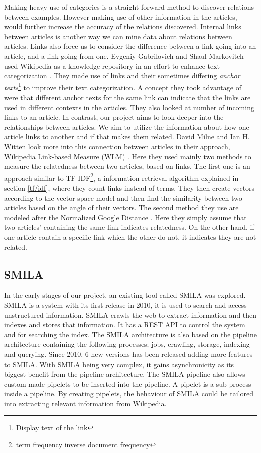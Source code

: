 Making heavy use of categories is a straight forward method to discover relations between examples. However making use of other information in the articles, would further increase the accuracy of the relations discovered. Internal links between articles is another way we can mine data about relations between articles. Links also force us to consider the difference between a link going into an article, and a link going from one. Evgeniy Gabrilovich and Shaul Markovitch used Wikipedia as a knowledge repository in an effort to enhance text categorization  \cite{text-cat}. They made use of links and their sometimes differing \textit{anchor texts}\footnote{Display text of the link} to improve their text categorization. A concept they took advantage of were that different anchor texts for the same link can indicate that the links are used in different contexts in the articles.  They also looked at number of incoming links to an article. In contrast, our project aims to look deeper into the relationships between articles. We aim to utilize the information about how one article links to another and if that makes them related. David Milne and Ian H. Witten look more into this connection between articles in their approach,  Wikipedia Link-based Measure (WLM) \cite{wlm}. Here they used mainly two methods to measure the relatedness between two articles, based on links. The first one is an approach similar to TF-IDF\footnote{term frequency inverse document frequency}, a information retrieval algorithm explained in section \ref{tf/idf}, where they count links instead of terms. They then create vectors according to the vector space model and then find the similarity between two articles based on the angle of their vectors. The second method they use are modeled after the Normalized Google Distance  \cite{gsd}. Here they simply assume that two articles' containing the same link indicates relatedness. On the other hand, if one article contain a specific link which the other do not, it indicates they are not related.

\subsection{SMILA} \label{smila}

In the early stages of our project, an existing tool called SMILA \cite{smila} was explored. SMILA is a system with its first release in 2010, it is used to search and access unstructured information. SMILA crawls the web to extract information and then indexes and stores that information. It has a REST API to control the system and for searching the index. The SMILA architecture is also based on the pipeline architecture containing the following processes; jobs, crawling, storage, indexing and querying. Since 2010, 6 new versions has been released adding more features to SMILA. With SMILA being very complex, it gains asynchronicity as its biggest benefit from the pipeline architecture. The SMILA pipeline also allows custom made pipelets to be inserted into the pipeline. A pipelet is a sub process inside a pipeline. By creating pipelets, the behaviour of SMILA could be tailored into extracting relevant information from Wikipedia.

